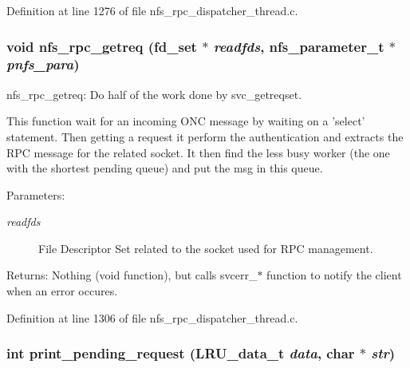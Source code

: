 Definition at line 1276 of file nfs\_\-rpc\_\-dispatcher\_\-thread.c.
\subsubsection[{nfs\_\-rpc\_\-getreq}]{\setlength{\rightskip}{0pt plus 5cm}void nfs\_\-rpc\_\-getreq (fd\_\-set $\ast$ {\em readfds}, \/  nfs\_\-parameter\_\-t $\ast$ {\em pnfs\_\-para})}\label{nfs__rpc__dispatcher__thread_8c_0785e886197e39cc730793e0988d02ce}


nfs\_\-rpc\_\-getreq: Do half of the work done by svc\_\-getreqset.

This function wait for an incoming ONC message by waiting on a 'select' statement. Then getting a request it perform the authentication and extracts the RPC message for the related socket. It then find the less busy worker (the one with the shortest pending queue) and put the msg in this queue.

\begin{Desc}
\item[Parameters:]
\begin{description}
\item[{\em readfds}]File Descriptor Set related to the socket used for RPC management.\end{description}
\end{Desc}
\begin{Desc}
\item[Returns:]Nothing (void function), but calls svcerr\_\-$\ast$ function to notify the client when an error occures. \end{Desc}


Definition at line 1306 of file nfs\_\-rpc\_\-dispatcher\_\-thread.c.
\subsubsection[{print\_\-pending\_\-request}]{\setlength{\rightskip}{0pt plus 5cm}int print\_\-pending\_\-request (LRU\_\-data\_\-t {\em data}, \/  char $\ast$ {\em str})}\label{nfs__rpc__dispatcher__thread_8c_9c4d5812b5445e27dec115567787e7c9}


